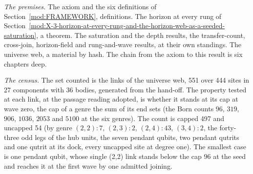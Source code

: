 \begin{chproof}
\textit{The premises.} The axiom and the six definitions of Section~\ref{mod:FRAMEWORK}, definitions. The horizon at every rung of Section~\ref{mod:X-3-horizon-at-every-rung-and-the-horizon-web-as-a-seeded-saturation}, a theorem. The saturation and the depth results, the transfer-count, cross-join, horizon-field and rung-and-wave results, at their own standings. The universe web, a material by hash. The chain from the axiom to this result is six chapters deep.

\textit{The census.} The set counted is the links of the universe web, 551 over 444 sites in 27 components with 36 bodies, generated from the hand-off. The property tested at each link, at the passage reading adopted, is whether it stands at its cap at wave zero, the cap of a genre the sum of its end sets (the Born counts $96$, $319$, $906$, $1036$, $2053$ and $5100$ at the six genres). The count is capped 497 and uncapped 54 (by genre $(2,2){:}7$, $(2,3){:}2$, $(2,4){:}43$, $(3,4){:}2$, the forty-three odd legs of the hub units, the seven pendant qubits, two pendant qutrits and one qutrit at its dock, every uncapped site at degree one). The smallest case is one pendant qubit, whose single (2,2) link stands below the cap $96$ at the seed and reaches it at the first wave by one admitted joining.


\end{chproof}
